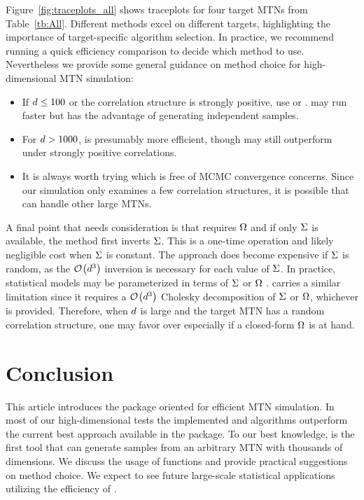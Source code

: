Figure~\ref{fig:traceplots_all} shows traceplots for four target MTNs from Table~\ref{tb:All}. Different methods excel on different targets, highlighting the importance of target-specific algorithm selection. In practice, we recommend running a quick efficiency comparison to decide which method to use.
Nevertheless we provide some general guidance on method choice for high-dimensional MTN simulation:
\begin{itemize}
	\item If $ d \leq 100 $ or the correlation structure is strongly positive, use \mt or \hhmc. 
	\hhmc may run faster but \mt has the advantage of generating independent samples.
	\item For $ d > 1000$,  \zhn is presumably more efficient, though \hhmc may still outperform under strongly positive correlations. 
	\item It is always worth trying \mt which is free of MCMC convergence concerns. Since our simulation only examines a few correlation structures, it is possible that \mt can handle other large MTNs. 
\end{itemize}
A final point that needs consideration is that \zhn requires $ \Omega $ and if only $ \Sigma $ is available, the method first inverts $ \Sigma $. This is a one-time operation and likely negligible cost when $ \Sigma $ is constant. 
The approach does become expensive if $ \Sigma $ is random, as the $ {\cal O}\hspace{-0.1em}\left( d^3 \right) $ inversion is necessary for each value of $ \Sigma $.
In practice, statistical models may be parameterized in terms of  $ \Sigma $  \citep{lachaab2006modeling, molstad2021gaussian} or $ \Omega $ \citep{baltagi2018generalized, lehnert2019large, li2020using}.
\hhmc carries a similar limitation since it requires a $ {\cal O}\hspace{-0.1em}\left( d^3 \right) $ Cholesky decomposition of $ \Sigma $ or $ \Omega $, whichever is provided.
Therefore, when $ d $ is large and the target MTN has a random correlation structure, one may favor \zhn over \hhmc especially if a closed-form $ \Omega $ is at hand.

\section{Conclusion}
This article introduces the  package oriented for efficient MTN simulation.
In most of our high-dimensional tests the implemented \hhmc and \zhmc algorithms outperform the current best approach available in the  package.
To our best knowledge,  is the first tool that can generate samples from an arbitrary MTN with thousands of dimensions. 
We discuss the usage of functions and provide practical suggestions on method choice.
We expect to see future large-scale statistical applications utilizing the efficiency of .

